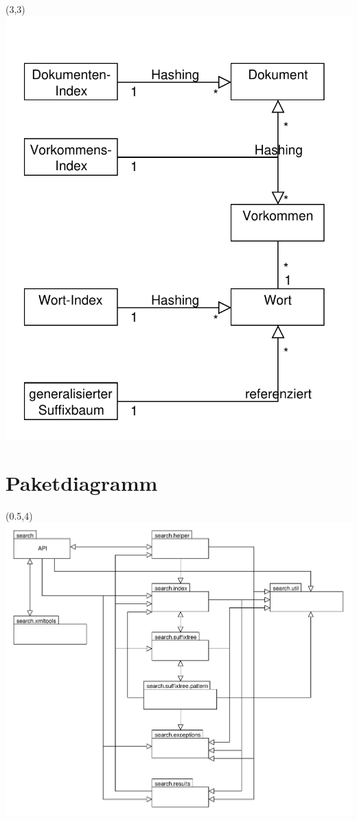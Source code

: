 \begin{textblock}{3}(3,3)
\includegraphics[scale=1]{resources/architecture.pdf}
\end{textblock}
\newpage

\section{Paketdiagramm}
\label{uml-package}

\begin{textblock}{3}(0.5,4)
\includegraphics[scale=0.68]{resources/packages.pdf}
\end{textblock}

